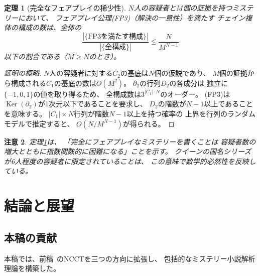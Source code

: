 \documentclass[12pt,twocolumn]{ltjsarticle}
\newtheorem{theorem}{定理}[section]
\newtheorem{remark}[theorem]{注意}
\newcommand{\Ker}{\operatorname{Ker}}
\begin{document}
\begin{theorem}[完全なフェアプレイの稀少性]
\label{thm:fairplay_rarity}
$N$人の容疑者と$M$個の証拠を持つミステリーにおいて、
フェアプレイ公理(FP3)（解決の一意性）を満たす
チェイン複体の構成の数は、全体の
\begin{equation}
\frac{|\{\text{FP3を満たす構成}\}|}{|\{\text{全構成}\}|}
\leq \frac{N}{M^{N-1}}
\end{equation}
以下の割合である（$M \geq N$のとき）。
\end{theorem}

\begin{proof}[証明の概略]
$N$人の容疑者に対する$C_2$の基底は$N$個の仮説であり、
$M$個の証拠から構成される$C_1$の基底の数は$O(M^2)$。
$\partial_2$の行列$D_2$の各成分は
独立に$\{-1, 0, 1\}$の値を取り得るため、
全構成数は$3^{|C_1| \cdot N}$のオーダー。
(FP3)は$\Ker(\partial_2)$が1次元以下であることを要求し、
$D_2$の階数が$N-1$以上であることを意味する。
$|C_1| \times N$行列が階数$N-1$以上を持つ確率の
上界を行列のランダムモデルで推定すると、
$O(N / M^{N-1})$が得られる。
\end{proof}

\begin{remark}
定理\ref{thm:fairplay_rarity}は、
「完全にフェアプレイなミステリーを書くことは
容疑者数の増大とともに指数関数的に困難になる」ことを示す。
クイーンの国名シリーズが6人程度の容疑者に限定されていることは、
この意味で数学的必然性を反映している。
\end{remark}


\section{結論と展望}
\label{sec:conclusion}

\subsection{本稿の貢献}

本稿では、前稿~\cite{Ishibashi2026I}のNCCTを三つの方向に拡張し、
包括的なミステリー小説解析理論を構築した。
\end{document}
